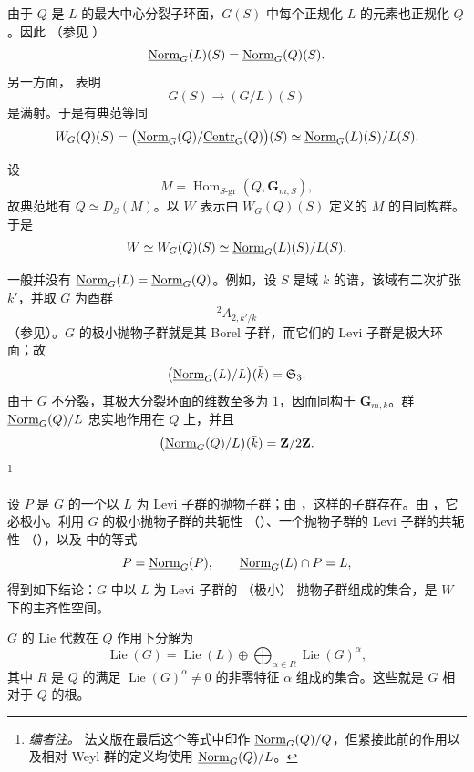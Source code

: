 
由于 \(Q\) 是 \(L\) 的最大中心分裂子环面，\(G(S)\) 中每个正规化 \(L\) 的元素也正规化 \(Q\)。因此 \textup{（参见 ）}
\[
 \underline{\operatorname{Norm}}_G(L)(S)=\underline{\operatorname{Norm}}_G(Q)(S).
\]
另一方面， 表明
\[
 G(S)\longrightarrow(G/L)(S)
\]
是满射。于是有典范等同
\[
 W_G(Q)(S)
 =\bigl(\underline{\operatorname{Norm}}_G(Q)/\underline{\operatorname{Centr}}_G(Q)\bigr)(S)
 \simeq\underline{\operatorname{Norm}}_G(L)(S)/L(S).
\]

设
\[
 M=\operatorname{Hom}_{S\text{-}\mathrm{gr}}
      (Q,\mathbf G_{m,S}),
\]
故典范地有 \(Q\simeq D_S(M)\)。以 \(W\) 表示由 \(W_G(Q)(S)\) 定义的 \(M\) 的自同构群。于是
\[
 W\simeq W_G(Q)(S)\simeq\underline{\operatorname{Norm}}_G(L)(S)/L(S).
\]


一般并没有 \(\underline{\operatorname{Norm}}_G(L)=\underline{\operatorname{Norm}}_G(Q)\)。例如，设 \(S\) 是域 \(k\) 的谱，该域有二次扩张 \(k'\)，并取 \(G\) 为酉群
\[
 {}^2\!A_{2,k'/k}
\]
\textup{（参见）}。\(G\) 的极小抛物子群就是其 Borel 子群，而它们的 Levi 子群是极大环面；故
\[
 \bigl(\underline{\operatorname{Norm}}_G(L)/L\bigr)(\bar k)=\mathfrak S_3.
\]
由于 \(G\) 不分裂，其极大分裂环面的维数至多为 \(1\)，因而同构于 \(\mathbf G_{m,k}\)。群 \(\underline{\operatorname{Norm}}_G(Q)/L\) 忠实地作用在 \(Q\) 上，并且
\[
 \bigl(\underline{\operatorname{Norm}}_G(Q)/L\bigr)(\bar k)=\mathbf Z/2\mathbf Z.
\]
\footnote{\emph{编者注。} 法文版在最后这个等式中印作 \(\underline{\operatorname{Norm}}_G(Q)/Q\)，但紧接此前的作用以及相对 Weyl 群的定义均使用 \(\underline{\operatorname{Norm}}_G(Q)/L\)。}


设 \(P\) 是 \(G\) 的一个以 \(L\) 为 Levi 子群的抛物子群；由 ，这样的子群存在。由 ，它必极小。利用 \(G\) 的极小抛物子群的共轭性 \textup{（）}、一个抛物子群的 Levi 子群的共轭性 \textup{（）}，以及  中的等式
\[
 P=\underline{\operatorname{Norm}}_G(P),\qquad \underline{\operatorname{Norm}}_G(L)\cap P=L,
\]
得到如下结论：\(G\) 中以 \(L\) 为 Levi 子群的 \textup{（极小）} 抛物子群组成的集合，是 \(W\) 下的主齐性空间。


\(G\) 的 Lie 代数在 \(Q\) 作用下分解为
\[
 \operatorname{Lie}(G)
 =\operatorname{Lie}(L)
  \oplus\bigoplus_{\alpha\in R}\operatorname{Lie}(G)^\alpha,
\]
其中 \(R\) 是 \(Q\) 的满足 \(\operatorname{Lie}(G)^\alpha\ne0\) 的非零特征 \(\alpha\) 组成的集合。这些就是 \(G\) 相对于 \(Q\) 的根。

